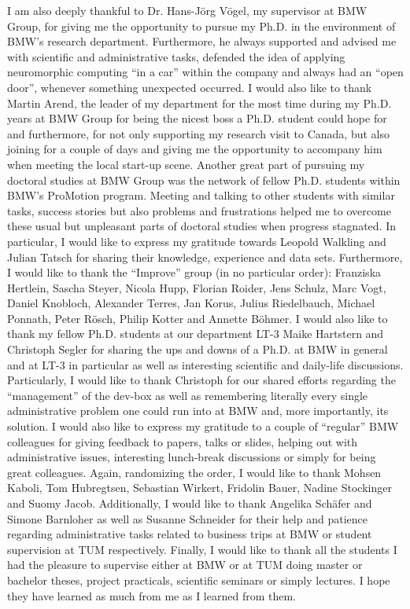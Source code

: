 I am also deeply thankful to Dr. Hans-J\"org V\"ogel, my supervisor at BMW Group, for giving me the opportunity to pursue my Ph.D. in the environment of BMW's research department.
Furthermore, he always supported and advised me with scientific and administrative tasks, defended the idea of applying neuromorphic computing \enquote{in a car} within the company and always had an \enquote{open door}, whenever something unexpected occurred.
I would also like to thank Martin Arend, the leader of my department for the most time during my Ph.D. years at BMW Group for being the nicest boss a Ph.D. student could hope for and furthermore, for not only supporting my research visit to Canada, but also joining for a couple of days and giving me the opportunity to accompany him when meeting the local start-up scene.
Another great part of pursuing my doctoral studies at BMW Group was the network of fellow Ph.D. students within BMW's ProMotion program.
Meeting and talking to other students with similar tasks, success stories but also problems and frustrations helped me to overcome these usual but unpleasant parts of doctoral studies when progress stagnated.
In particular, I would like to express my gratitude towards Leopold Walkling and Julian Tatsch for sharing their knowledge, experience and data sets.
Furthermore, I would like to thank the \enquote{Improve} group (in no particular order): Franziska Hertlein, Sascha Steyer, Nicola Hupp, Florian Roider, Jens Schulz, Marc Vogt, Daniel Knobloch, Alexander Terres, Jan Korus, Julius Riedelbauch, Michael Ponnath, Peter R\"osch, Philip Kotter and Annette B\"ohmer.
I would also like to thank my fellow Ph.D. students at our department LT-3 Maike Hartstern and Christoph Segler for sharing the ups and downs of a Ph.D. at BMW in general and at LT-3 in particular as well as interesting scientific and daily-life discussions.
Particularly, I would like to thank Christoph for our shared efforts regarding the \enquote{management} of the dev-box as well as remembering literally every single administrative problem one could run into at BMW and, more importantly, its solution.
I would also like to express my gratitude to a couple of \enquote{regular} BMW colleagues for giving feedback to papers, talks or slides, helping out with administrative issues, interesting lunch-break discussions or simply for being great colleagues.
Again, randomizing the order, I would like to thank Mohsen Kaboli, Tom Hubregtsen, Sebastian Wirkert, Fridolin Bauer, Nadine Stockinger and Suomy Jacob. 
Additionally, I would like to thank Angelika Sch\"afer and Simone Barnloher as well as Susanne Schneider for their help and patience regarding administrative tasks related to business trips at BMW or student supervision at TUM respectively.
Finally, I would like to thank all the students I had the pleasure to supervise either at BMW or at TUM doing master or bachelor theses, project practicals, scientific seminars or simply lectures.
I hope they have learned as much from me as I learned from them.

